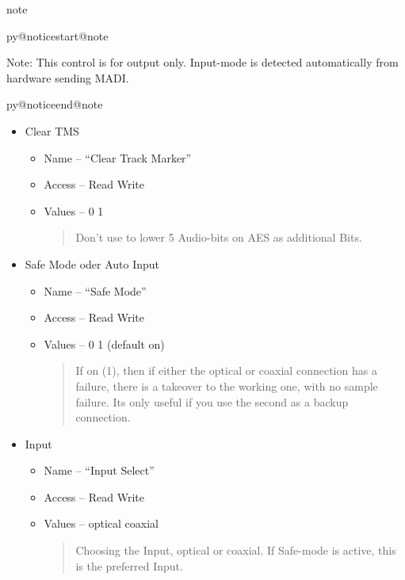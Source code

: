 \documentclass[a4paper,8pt,english]{sphinxmanual}
\makeatletter
\renewenvironment{notice}[2]{%
          \def\py@noticetype{#1}
          \begin{coloredbox}{#1}
          \bf\it
          \par\strong{#2}
          \csname py@noticestart@#1\endcsname
        }
	{
          \csname py@noticeend@\py@noticetype\endcsname
          \end{coloredbox}
        }
\makeatother
\begin{document}
\begin{notice}{note}{Note:}
Note: This control is for output only. Input-mode is detected
automatically from hardware sending MADI.
\end{notice}
\begin{itemize}
\item {} 
Clear TMS
\begin{itemize}
\item {} 
Name -- ``Clear Track Marker''

\item {} 
Access -- Read Write

\item {} 
Values -- 0 1
\begin{quote}

Don't use to lower 5 Audio-bits on AES as additional Bits.
\end{quote}

\end{itemize}

\item {} 
Safe Mode oder Auto Input
\begin{itemize}
\item {} 
Name -- ``Safe Mode''

\item {} 
Access -- Read Write

\item {} 
Values -- 0 1 (default on)
\begin{quote}

If on (1), then if either the optical or coaxial connection
has a failure, there is a takeover to the working one, with no
sample failure. Its only useful if you use the second as a
backup connection.
\end{quote}

\end{itemize}

\item {} 
Input
\begin{itemize}
\item {} 
Name -- ``Input Select''

\item {} 
Access -- Read Write

\item {} 
Values -- optical coaxial
\begin{quote}

Choosing the Input, optical or coaxial. If Safe-mode is active,
this is the preferred Input.
\end{quote}

\end{itemize}

\end{itemize}
\end{document}
